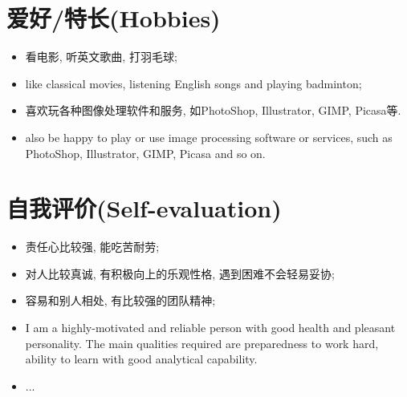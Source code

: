 \documentclass[a4paper,10pt,english]{manual}
\begin{document}
\section{爱好/特长(Hobbies)}
\begin{itemize}
\item {} 
看电影, 听英文歌曲, 打羽毛球;

\item {} 
like classical movies, listening English songs and playing badminton;

\item {} 
喜欢玩各种图像处理软件和服务, 如PhotoShop, Illustrator, GIMP, Picasa等.

\item {} 
also be happy to play or use image processing software or services, such as PhotoShop, Illustrator, GIMP, Picasa and so on.

\end{itemize}


\section{自我评价(Self-evaluation)}
\begin{itemize}
\item {} 
责任心比较强, 能吃苦耐劳;

\item {} 
对人比较真诚, 有积极向上的乐观性格, 遇到困难不会轻易妥协;

\item {} 
容易和别人相处, 有比较强的团队精神;

\item {} 
I am a highly-motivated and reliable person with good health and pleasant personality. The main qualities required are preparedness to work hard, ability to learn with good analytical capability.

\item {} 
...

\end{itemize}


\end{document}
